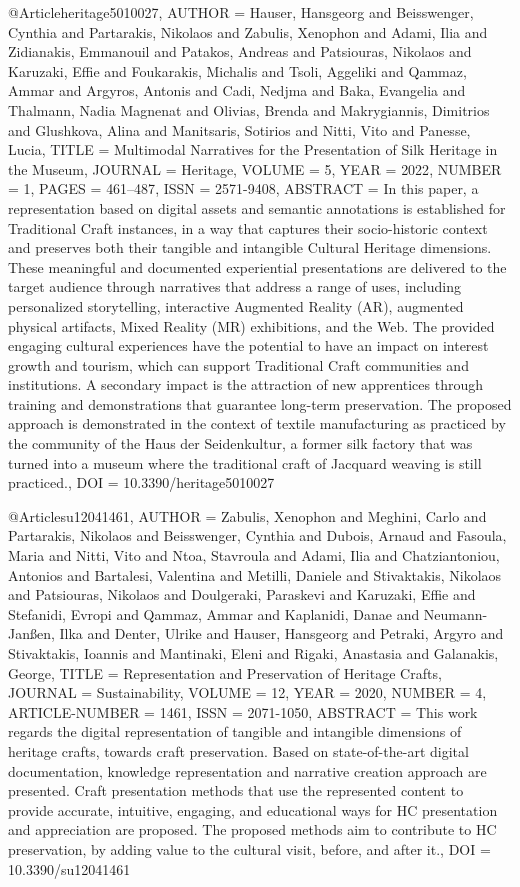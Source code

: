 
@Article{heritage5010027,
AUTHOR = {Hauser, Hansgeorg and Beisswenger, Cynthia and Partarakis, Nikolaos and Zabulis, Xenophon and Adami, Ilia and Zidianakis, Emmanouil and Patakos, Andreas and Patsiouras, Nikolaos and Karuzaki, Effie and Foukarakis, Michalis and Tsoli, Aggeliki and Qammaz, Ammar and Argyros, Antonis and Cadi, Nedjma and Baka, Evangelia and Thalmann, Nadia Magnenat and Olivias, Brenda and Makrygiannis, Dimitrios and Glushkova, Alina and Manitsaris, Sotirios and Nitti, Vito and Panesse, Lucia},
TITLE = {Multimodal Narratives for the Presentation of Silk Heritage in the Museum},
JOURNAL = {Heritage},
VOLUME = {5},
YEAR = {2022},
NUMBER = {1},
PAGES = {461--487},
ISSN = {2571-9408},
ABSTRACT = {In this paper, a representation based on digital assets and semantic annotations is established for Traditional Craft instances, in a way that captures their socio-historic context and preserves both their tangible and intangible Cultural Heritage dimensions. These meaningful and documented experiential presentations are delivered to the target audience through narratives that address a range of uses, including personalized storytelling, interactive Augmented Reality (AR), augmented physical artifacts, Mixed Reality (MR) exhibitions, and the Web. The provided engaging cultural experiences have the potential to have an impact on interest growth and tourism, which can support Traditional Craft communities and institutions. A secondary impact is the attraction of new apprentices through training and demonstrations that guarantee long-term preservation. The proposed approach is demonstrated in the context of textile manufacturing as practiced by the community of the Haus der Seidenkultur, a former silk factory that was turned into a museum where the traditional craft of Jacquard weaving is still practiced.},
DOI = {10.3390/heritage5010027}
}


@Article{su12041461,
AUTHOR = {Zabulis, Xenophon and Meghini, Carlo and Partarakis, Nikolaos and Beisswenger, Cynthia and Dubois, Arnaud and Fasoula, Maria and Nitti, Vito and Ntoa, Stavroula and Adami, Ilia and Chatziantoniou, Antonios and Bartalesi, Valentina and Metilli, Daniele and Stivaktakis, Nikolaos and Patsiouras, Nikolaos and Doulgeraki, Paraskevi and Karuzaki, Effie and Stefanidi, Evropi and Qammaz, Ammar and Kaplanidi, Danae and Neumann-Janßen, Ilka and Denter, Ulrike and Hauser, Hansgeorg and Petraki, Argyro and Stivaktakis, Ioannis and Mantinaki, Eleni and Rigaki, Anastasia and Galanakis, George},
TITLE = {Representation and Preservation of Heritage Crafts},
JOURNAL = {Sustainability},
VOLUME = {12},
YEAR = {2020},
NUMBER = {4},
ARTICLE-NUMBER = {1461},
ISSN = {2071-1050},
ABSTRACT = {This work regards the digital representation of tangible and intangible dimensions of heritage crafts, towards craft preservation. Based on state-of-the-art digital documentation, knowledge representation and narrative creation approach are presented. Craft presentation methods that use the represented content to provide accurate, intuitive, engaging, and educational ways for HC presentation and appreciation are proposed. The proposed methods aim to contribute to HC preservation, by adding value to the cultural visit, before, and after it.},
DOI = {10.3390/su12041461}
}



